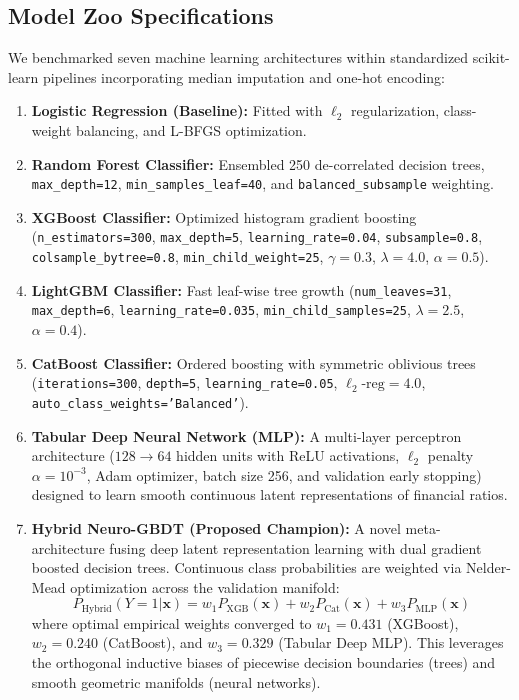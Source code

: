 \documentclass[conference]{IEEEtran}
\begin{document}
\subsection{Model Zoo Specifications}
We benchmarked seven machine learning architectures within standardized scikit-learn pipelines incorporating median imputation and one-hot encoding:
\begin{enumerate}
    \item \textbf{Logistic Regression (Baseline):} Fitted with $\ell_2$ regularization, class-weight balancing, and L-BFGS optimization.
    \item \textbf{Random Forest Classifier:} Ensembled 250 de-correlated decision trees, \texttt{max\_depth=12}, \texttt{min\_samples\_leaf=40}, and \texttt{balanced\_subsample} weighting.
    \item \textbf{XGBoost Classifier:} Optimized histogram gradient boosting (\texttt{n\_estimators=300}, \texttt{max\_depth=5}, \texttt{learning\_rate=0.04}, \texttt{subsample=0.8}, \texttt{colsample\_bytree=0.8}, \texttt{min\_child\_weight=25}, $\gamma=0.3$, $\lambda=4.0$, $\alpha=0.5$).
    \item \textbf{LightGBM Classifier:} Fast leaf-wise tree growth (\texttt{num\_leaves=31}, \texttt{max\_depth=6}, \texttt{learning\_rate=0.035}, \texttt{min\_child\_samples=25}, $\lambda=2.5$, $\alpha=0.4$).
    \item \textbf{CatBoost Classifier:} Ordered boosting with symmetric oblivious trees (\texttt{iterations=300}, \texttt{depth=5}, \texttt{learning\_rate=0.05}, $\ell_2\text{-reg}=4.0$, \texttt{auto\_class\_weights='Balanced'}).
    \item \textbf{Tabular Deep Neural Network (MLP):} A multi-layer perceptron architecture ($128 \rightarrow 64$ hidden units with ReLU activations, $\ell_2$ penalty $\alpha=10^{-3}$, Adam optimizer, batch size 256, and validation early stopping) designed to learn smooth continuous latent representations of financial ratios.
    \item \textbf{Hybrid Neuro-GBDT (Proposed Champion):} A novel meta-architecture fusing deep latent representation learning with dual gradient boosted decision trees. Continuous class probabilities are weighted via Nelder-Mead optimization across the validation manifold:
    \begin{equation}
    P_{\text{Hybrid}}(Y=1|\mathbf{x}) = w_1 P_{\text{XGB}}(\mathbf{x}) + w_2 P_{\text{Cat}}(\mathbf{x}) + w_3 P_{\text{MLP}}(\mathbf{x})
    \end{equation}
    where optimal empirical weights converged to $w_1 = 0.431$ (XGBoost), $w_2 = 0.240$ (CatBoost), and $w_3 = 0.329$ (Tabular Deep MLP). This leverages the orthogonal inductive biases of piecewise decision boundaries (trees) and smooth geometric manifolds (neural networks).
\end{enumerate}
\end{document}
